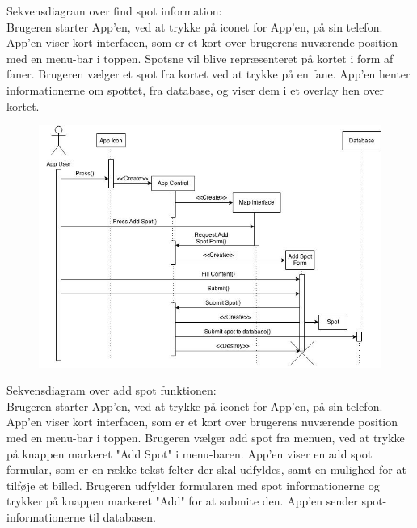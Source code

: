 \documentclass[12pt]{article}
\begin{document}
Sekvensdiagram over find spot information:\\
Brugeren starter App'en, ved at trykke på iconet for App'en, på sin telefon. App'en viser kort interfacen, 
som er et kort over brugerens nuværende position med en menu-bar i toppen. Spotsne vil blive repræsenteret 
på kortet i form af faner. Brugeren vælger et spot fra kortet ved at trykke på en fane. App'en henter
informationerne om spottet, fra database, og viser dem i et overlay hen over kortet.
\newpage

\begin{figure}[h]
\includegraphics[scale = 0.5]{sekdia2}
\end{figure}

Sekvensdiagram over add spot funktionen:\\
Brugeren starter App'en, ved at trykke på iconet for App'en, på sin telefon. App'en viser kort interfacen, 
som er et kort over brugerens nuværende position med en menu-bar i toppen. Brugeren vælger add spot fra menuen, 
ved at trykke på knappen markeret "Add Spot" i menu-baren. App'en viser en add spot formular, som er en række 
tekst-felter der skal udfyldes, samt en mulighed for at tilføje et billed. Brugeren udfylder formularen med spot 
informationerne og trykker på knappen markeret "Add" for at submite den. App'en sender spot-informationerne til databasen.

\newpage
\end{document}
